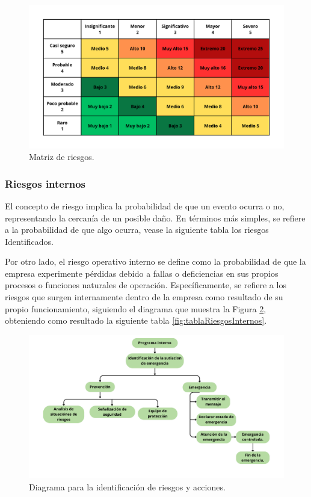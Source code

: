      \begin{figure}[H]
        \centering
        \includegraphics[scale=0.17]{15/img/nivelesDeRiesgos.pdf}
        \caption{Matriz de riesgos.}
        \label{fig:nivelesDeRiesgos}
    \end{figure}
    
    \subsubsection{Riesgos internos}
    
    El concepto de riesgo implica la probabilidad de que un evento ocurra o no, representando la cercanía de un posible daño. En términos más simples, se refiere a la probabilidad de que algo ocurra, vease la siguiente tabla los riesgos Identificados.
    
    Por otro lado, el riesgo operativo interno se define como la probabilidad de que la empresa experimente pérdidas debido a fallas o deficiencias en sus propios procesos o funciones naturales de operación. Específicamente, se refiere a los riesgos que surgen internamente dentro de la empresa como resultado de su propio funcionamiento, siguiendo el diagrama que muestra la Figura \ref{fig:diagramaIdentificacionRiesgosAcciones}, obteniendo como resultado la siguiente tabla \ref{fig:tablaRiesgosInternos}.
    
    \begin{figure}[H]
        \centering
        \includegraphics[scale=0.17]{15/img/diagramaIdentifiacionRiesgosAcciones.pdf}
        \caption{Diagrama para la identificación de riesgos y acciones.}
        \label{fig:diagramaIdentificacionRiesgosAcciones}
    \end{figure}
    
